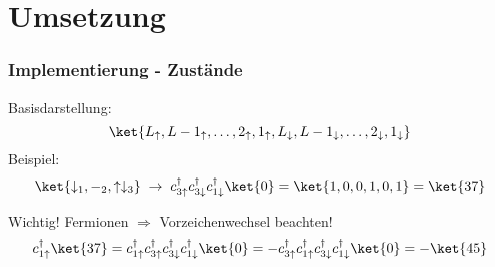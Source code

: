 \documentclass{beamer}
\begin{document}



\section{Umsetzung}
\begin{frame}
\frametitle{Implementierung - Zustände}
Basisdarstellung:
\[ \ket{L_\uparrow,L-1_\uparrow,\dots,2_\uparrow,1_\uparrow,L_\downarrow,L-1_\downarrow,\dots,2_\downarrow,1_\downarrow} \]
Beispiel:
\[ \ket{\downarrow_1,-_2,\uparrow\downarrow_3}\;\rightarrow \; c^\dagger_{3\uparrow}c^\dagger_{3\downarrow}c^\dagger_{1\downarrow}\ket{0} = \ket{1, 0, 0, 1, 0 , 1} = \ket{37} \]\pause
\begin{block}{Wichtig!}
Fermionen $ \Rightarrow $ Vorzeichenwechsel beachten!
\[ c^\dagger_{1\uparrow}\ket{37} =  c^\dagger_{1\uparrow}c^\dagger_{3\uparrow}c^\dagger_{3\downarrow}c^\dagger_{1\downarrow}\ket{0}=-c^\dagger_{3\uparrow}c^\dagger_{1\uparrow}c^\dagger_{3\downarrow}c^\dagger_{1\downarrow}\ket{0}=-\ket{45}\]
\end{block}
\end{frame}
\end{document}
